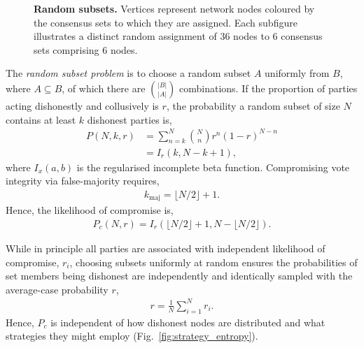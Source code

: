 
\begin{figure}[!htb]
	\centering
	\resizebox{0.5\columnwidth}{!}{
	
	}
	\caption{\textbf{Random subsets.} Vertices represent network nodes coloured by the consensus sets to which they are assigned. Each subfigure illustrates a distinct random assignment of 36 nodes to 6 consensus sets comprising 6 nodes.} \label{fig:random_subsets}
\end{figure}

The \emph{random subset problem} is to choose a random subset $A$ uniformly from $B$, where $A\subseteq B$, of which there are $\binom{|B|}{|A|}$ combinations. If the proportion of parties acting dishonestly and collusively is $r$, the probability a random subset of size $N$ contains at least $k$ dishonest parties is,
\begin{align}
	P(N,k,r) & = \sum_{n=k}^{N} \binom{N}{n} {r}^n (1-r)^{N-n} \nonumber \\
	         & = I_r(k,N-k+1),
\end{align}
where $I_x(a,b)$ is the regularised incomplete beta function. Compromising vote integrity via false-majority requires,
\begin{align}
	k_\mathrm{maj} = \lfloor N/2 \rfloor + 1.
\end{align}
Hence, the likelihood of compromise is,
\begin{align}
	P_c(N,r) = I_r(\lfloor N/2 \rfloor + 1,N-\lfloor N/2 \rfloor).
\end{align}

While in principle all parties are associated with independent likelihood of compromise, $r_i$, choosing subsets uniformly at random ensures the probabilities of set members being dishonest are independently and identically sampled with the average-case probability $r$,
\begin{align} \label{eq:av_r_uniform}
	r = \frac{1}{N} \sum_{i=1}^N r_i.
\end{align}
Hence, $P_c$ is independent of how dishonest nodes are distributed and what strategies they might employ (Fig.~\ref{fig:strategy_entropy}).

